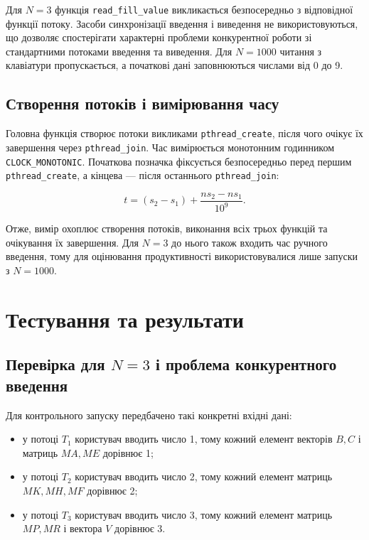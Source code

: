 \documentclass[12pt,a4paper]{article}
\begin{document}
Для \(N=3\) функція \texttt{read\_fill\_value} викликається безпосередньо
з відповідної функції потоку. Засоби синхронізації введення і виведення не
використовуються, що дозволяє спостерігати характерні проблеми конкурентної
роботи зі стандартними потоками введення та виведення. Для \(N=1000\)
читання з клавіатури пропускається, а початкові дані заповнюються числами
від 0 до 9.

\subsection{Створення потоків і вимірювання часу}

Головна функція створює потоки викликами \texttt{pthread\_create}, після
чого очікує їх завершення через \texttt{pthread\_join}. Час вимірюється
монотонним годинником \texttt{CLOCK\_MONOTONIC}. Початкова позначка
фіксується безпосередньо перед першим \texttt{pthread\_create}, а кінцева
--- після останнього \texttt{pthread\_join}:

\begin{equation}
  t = (s_2-s_1)+\frac{ns_2-ns_1}{10^9}.
\end{equation}

Отже, вимір охоплює створення потоків, виконання всіх трьох функцій та
очікування їх завершення. Для \(N=3\) до нього також входить час ручного
введення, тому для оцінювання продуктивності використовувалися лише запуски
з \(N=1000\).

\section{Тестування та результати}

\subsection{Перевірка для \texorpdfstring{\(N=3\)}{N=3} і проблема конкурентного введення}

Для контрольного запуску передбачено такі конкретні вхідні дані:

\begin{itemize}[leftmargin=*,itemsep=0.25em]
  \item у потоці \(T_1\) користувач вводить число 1, тому кожний елемент
    векторів \(B,C\) і матриць \(MA,ME\) дорівнює 1;
  \item у потоці \(T_2\) користувач вводить число 2, тому кожний елемент
    матриць \(MK,MH,MF\) дорівнює 2;
  \item у потоці \(T_3\) користувач вводить число 3, тому кожний елемент
    матриць \(MP,MR\) і вектора \(V\) дорівнює 3.
\end{itemize}
\end{document}
